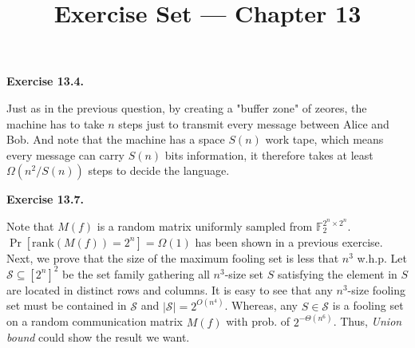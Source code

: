 \documentclass[a4paper]{article}
\title{Exercise Set --- Chapter 13}
\date{}
\newenvironment{exercise}[1]{
	\par
	\noindent\textbf{Exercise #1.}\quad
}{
	\par
	\bigskip
}
\begin{document}
    \maketitle

    \begin{exercise}{13.4}
    Just as in the previous question, by creating a "buffer zone" of zeores, the machine has to take $n$ steps just to transmit every message between Alice and Bob. And note that the machine has a space $S(n)$ work tape, which means every message can carry $S(n)$ bits information, it therefore takes at least $\Omega(n^2 / S(n))$ steps to decide the language.   
    \end{exercise}

    \begin{exercise}{13.7}
    	Note that $M(f)$ is a random matrix uniformly sampled from $\mathbb F_2^{2^n\times 2^n}$. $\Pr[\text{rank}(M(f)) = 2^n] = \Omega(1)$ has been shown in a previous exercise. Next, we prove that the size of the maximum fooling set is less that $n^3$ w.h.p. Let $\mathcal S \subseteq [2^n]^2$ be the set family gathering all $n^3$-size set $S$ satisfying the element in $S$ are located in distinct rows and columns. It is easy to see that any $n^3$-size fooling set must be contained in $\mathcal S$ and $|\mathcal S| = 2^{O(n^4)}$. Whereas, any $S \in \mathcal S$ is a fooling set on a random communication matrix $M(f)$ with prob. of $2^{-\Theta(n^6)}$. Thus, \emph{Union bound} could show the result we want.
    \end{exercise}
\end{document}
